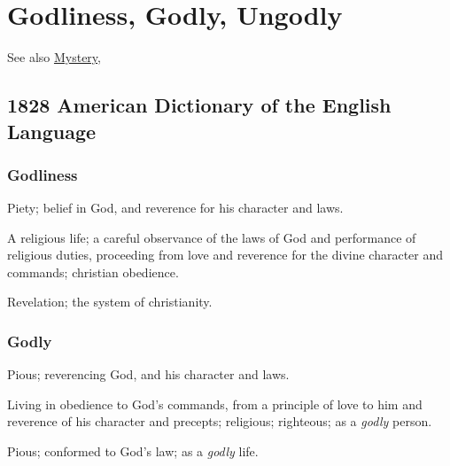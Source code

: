 \section{Godliness, Godly, Ungodly}
	\label{GODLINESS}
	\label{UNGODLY}
	
	See also \hyperref[MYSTERY]{Mystery}, 
	

\subsection{1828 American Dictionary of the English Language} %
	\label{GODLINESS-1828}
	
	\subsubsection{Godliness}

		\begin{compactitem}
			\item Piety; belief in God, and reverence for his character and laws.
			\item[1] A religious life; a careful observance of the laws of God and performance of religious duties, proceeding from love and reverence for the divine character and commands; christian obedience.
			\item[2] Revelation; the system of christianity.
		\end{compactitem}
		
	\subsubsection{Godly}

		\begin{compactitem}
			\item Pious; reverencing God, and his character and laws.
			\item[1] Living in obedience to God's commands, from a principle of love to him and reverence of his character and precepts; religious; righteous; as a \textit{godly} person.
			\item[2] Pious; conformed to God's law; as a \textit{godly} life.
		\end{compactitem}

